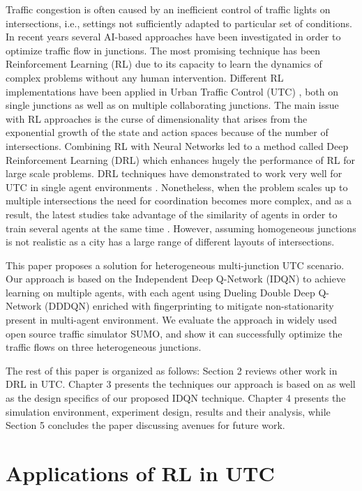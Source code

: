\documentclass{llncs}
\begin{document}
Traffic congestion is often caused by an inefficient control of traffic lights on intersections, i.e., settings not sufficiently adapted to particular set of conditions. In recent years several AI-based approaches have been investigated in order to optimize traffic flow in junctions. The most promising technique has been Reinforcement Learning (RL) due to its capacity to learn the dynamics of complex problems without any human intervention. Different RL implementations have been applied in Urban Traffic Control (UTC) \cite{Chu2017,Dusparic2016,El-Tantawy2012,Tahifa2015}, both on single junctions as well as on multiple collaborating junctions. The main issue with RL approaches is the curse of dimensionality that arises from the exponential growth of the state and action spaces because of the number of intersections.
Combining RL with Neural Networks led to a method called Deep Reinforcement Learning (DRL) which enhances hugely the performance of RL for large scale problems. DRL techniques have demonstrated to work very well for UTC in single agent environments \cite{Gao2017,Li2016,Liang2018,Mousavi2017}. Nonetheless, when the problem scales up to multiple intersections the need for coordination becomes more complex, and as a result, the latest studies take advantage of the similarity of agents in order to train several agents at the same time \cite{Liu2017CooperativeDR,VanDerPol2016}. However, assuming homogeneous junctions is not realistic as a city has a large range of different layouts of intersections.

This paper proposes a solution for heterogeneous multi-junction UTC scenario. Our approach is based on the  Independent Deep Q-Network (IDQN) to achieve learning on multiple agents, with each agent using Dueling Double Deep Q-Network (DDDQN) enriched with fingerprinting to mitigate non-stationarity present in multi-agent environment. We evaluate the approach in widely used open source traffic simulator SUMO, and show it can successfully optimize the traffic flows on three heterogeneous junctions. 

The rest of this paper is organized as follows: Section 2 reviews other work in DRL in UTC. Chapter 3 presents the techniques our approach is based on as well as the design specifics of our proposed IDQN technique. Chapter 4 presents the simulation environment, experiment design, results and their analysis, while Section 5 concludes the paper discussing avenues for future work. 

\section{Applications of RL in UTC} \label{relatedwork}
\end{document}

